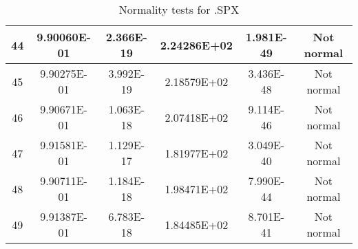 \begin{table}[h]
\begin{tabular}{|c|c|c|c|c|c|}
		44 & 9.90060E-01 & 2.366E-19 & 2.24286E+02 & 1.981E-49 & Not normal\\\hline
		45 & 9.90275E-01 & 3.992E-19 & 2.18579E+02 & 3.436E-48 & Not normal\\\hline
		46 & 9.90671E-01 & 1.063E-18 & 2.07418E+02 & 9.114E-46 & Not normal\\\hline
		47 & 9.91581E-01 & 1.129E-17 & 1.81977E+02 & 3.049E-40 & Not normal\\\hline
		48 & 9.90711E-01 & 1.184E-18 & 1.98471E+02 & 7.990E-44 & Not normal\\\hline
		49 & 9.91387E-01 & 6.783E-18 & 1.84485E+02 & 8.701E-41 & Not normal\\\hline
	\end{tabular}
	\caption{Normality tests for .SPX}
\end{table}
